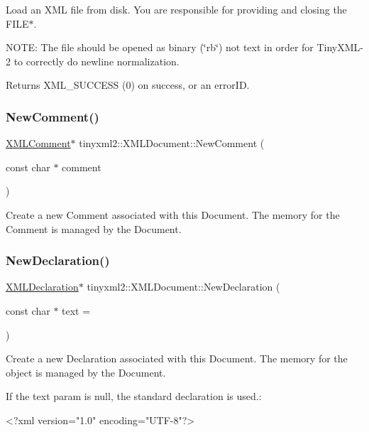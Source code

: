 Load an X\+ML file from disk. You are responsible for providing and closing the F\+I\+L\+E$\ast$.

N\+O\+TE\+: The file should be opened as binary (\char`\"{}rb\char`\"{}) not text in order for Tiny\+X\+M\+L-\/2 to correctly do newline normalization.

Returns X\+M\+L\+\_\+\+S\+U\+C\+C\+E\+SS (0) on success, or an error\+ID. \mbox{\label{classtinyxml2_1_1XMLDocument_ade4874bcb439954972ef2b3723ff3259}} 
\subsubsection{\texorpdfstring{NewComment()}{NewComment()}}
{\footnotesize\ttfamily \mbox{\hyperlink{classtinyxml2_1_1XMLComment}{X\+M\+L\+Comment}}$\ast$ tinyxml2\+::\+X\+M\+L\+Document\+::\+New\+Comment (\begin{DoxyParamCaption}\item[{const char $\ast$}]{comment }\end{DoxyParamCaption})}

Create a new Comment associated with this Document. The memory for the Comment is managed by the Document. \mbox{\label{classtinyxml2_1_1XMLDocument_aee2eb3435923f5494dcc70ac225b60a2}} 
\subsubsection{\texorpdfstring{NewDeclaration()}{NewDeclaration()}}
{\footnotesize\ttfamily \mbox{\hyperlink{classtinyxml2_1_1XMLDeclaration}{X\+M\+L\+Declaration}}$\ast$ tinyxml2\+::\+X\+M\+L\+Document\+::\+New\+Declaration (\begin{DoxyParamCaption}\item[{const char $\ast$}]{text = {} }\end{DoxyParamCaption})}

Create a new Declaration associated with this Document. The memory for the object is managed by the Document.

If the \textquotesingle{}text\textquotesingle{} param is null, the standard declaration is used.\+: \begin{DoxyVerb}    <?xml version="1.0" encoding="UTF-8"?>
\end{DoxyVerb}
 \mbox{\label{classtinyxml2_1_1XMLDocument_a8aa7817d4a1001364b06373763ab99d6}} 
